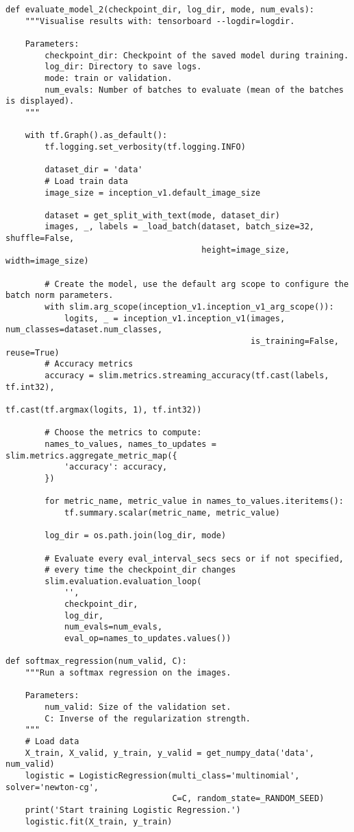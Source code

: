\begin{lstlisting}
def evaluate_model_2(checkpoint_dir, log_dir, mode, num_evals):
    """Visualise results with: tensorboard --logdir=logdir. 
    
    Parameters:
        checkpoint_dir: Checkpoint of the saved model during training.
        log_dir: Directory to save logs.
        mode: train or validation.
        num_evals: Number of batches to evaluate (mean of the batches is displayed).
    """
    
    with tf.Graph().as_default():
        tf.logging.set_verbosity(tf.logging.INFO)

        dataset_dir = 'data'
        # Load train data
        image_size = inception_v1.default_image_size

        dataset = get_split_with_text(mode, dataset_dir)
        images, _, labels = _load_batch(dataset, batch_size=32, shuffle=False, 
                                        height=image_size, width=image_size)

        # Create the model, use the default arg scope to configure the batch norm parameters.
        with slim.arg_scope(inception_v1.inception_v1_arg_scope()):
            logits, _ = inception_v1.inception_v1(images, num_classes=dataset.num_classes, 
                                                  is_training=False, reuse=True)
        # Accuracy metrics
        accuracy = slim.metrics.streaming_accuracy(tf.cast(labels, tf.int32),
                                                   tf.cast(tf.argmax(logits, 1), tf.int32))

        # Choose the metrics to compute:
        names_to_values, names_to_updates = slim.metrics.aggregate_metric_map({
            'accuracy': accuracy,
        })

        for metric_name, metric_value in names_to_values.iteritems():
            tf.summary.scalar(metric_name, metric_value)

        log_dir = os.path.join(log_dir, mode)

        # Evaluate every eval_interval_secs secs or if not specified,
        # every time the checkpoint_dir changes
        slim.evaluation.evaluation_loop(
            '',
            checkpoint_dir,
            log_dir,
            num_evals=num_evals,
            eval_op=names_to_updates.values())
        
def softmax_regression(num_valid, C):
    """Run a softmax regression on the images.

    Parameters:
        num_valid: Size of the validation set.
        C: Inverse of the regularization strength.
    """
    # Load data
    X_train, X_valid, y_train, y_valid = get_numpy_data('data', num_valid)
    logistic = LogisticRegression(multi_class='multinomial', solver='newton-cg',
                                  C=C, random_state=_RANDOM_SEED)
    print('Start training Logistic Regression.')
    logistic.fit(X_train, y_train)


\end{lstlisting}
